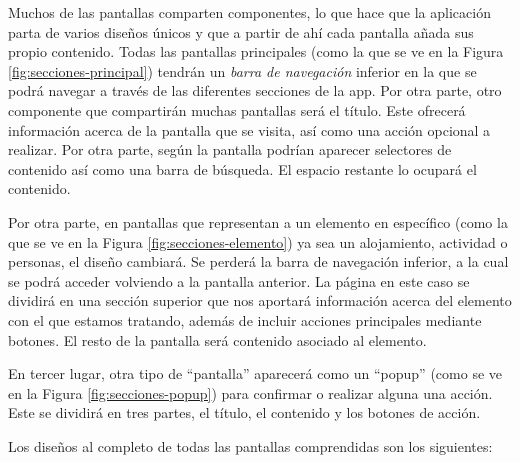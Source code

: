 Muchos de las pantallas comparten componentes, lo que hace que la aplicación parta de varios diseños únicos y que a partir de ahí cada pantalla añada sus propio contenido. Todas las pantallas principales (como la que se ve en la Figura \ref{fig:secciones-principal}) tendrán un \textit{barra de navegación} inferior en la que se podrá navegar a través de las diferentes secciones de la app. Por otra parte, otro componente que compartirán muchas pantallas será el título. Este ofrecerá información acerca de la pantalla que se visita, así como una acción opcional a realizar. Por otra parte, según la pantalla podrían aparecer selectores de contenido así como una barra de búsqueda. El espacio restante lo ocupará el contenido.      

Por otra parte, en pantallas que representan a un elemento en específico (como la que se ve en la Figura \ref{fig:secciones-elemento}) ya sea un alojamiento, actividad o personas, el diseño cambiará. Se perderá la barra de navegación inferior, a la cual se podrá acceder volviendo a la pantalla anterior. La página en este caso se dividirá en una sección superior que nos aportará información acerca del elemento con el que estamos tratando, además de incluir acciones principales mediante botones. El resto de la pantalla será contenido asociado al elemento.

En tercer lugar, otra tipo de ``pantalla'' aparecerá como un ``popup'' (como se ve en la Figura \ref{fig:secciones-popup}) para confirmar o realizar alguna una acción. Este se dividirá en tres partes, el título, el contenido y los botones de acción.

Los diseños al completo de todas las pantallas comprendidas son los siguientes:

